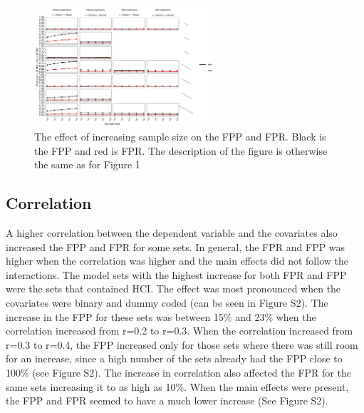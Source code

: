 \begin{figure}[t]
\includegraphics[width=0.6\textwidth]{R/Analysis/Result/Figures/Figure1D.jpeg}
\centering
\caption{The effect of increasing sample size on the FPP and FPR. Black is the FPP and red is FPR. The description of the figure is otherwise the same as for Figure 1}
\label{fig:mainfigure}
\end{figure}

\subsection{Correlation}
A higher correlation between the dependent variable and the covariates also increased the FPP and FPR for some sets. In general, the FPR and FPP was higher when the correlation was higher and the main effects did not follow the interactions. The model sets with the highest increase for both FPR and FPP were the sets that contained HCI. The effect was most pronounced when the covariates were binary and dummy coded (can be seen in Figure S2). The increase in the FPP for these sets was between 15\% and 23\% when the correlation increased from r=0.2 to r=0.3. When the correlation increased from r=0.3 to r=0.4, the FPP increased only for those sets where there was still room for an increase, since a high number of the sets already had the FPP close to 100\% (see Figure S2). The increase in correlation also affected the FPR for the same sets increasing it to as high as 10\%. When the main effects were present, the FPP and FPR seemed to have a much lower increase (See Figure S2).